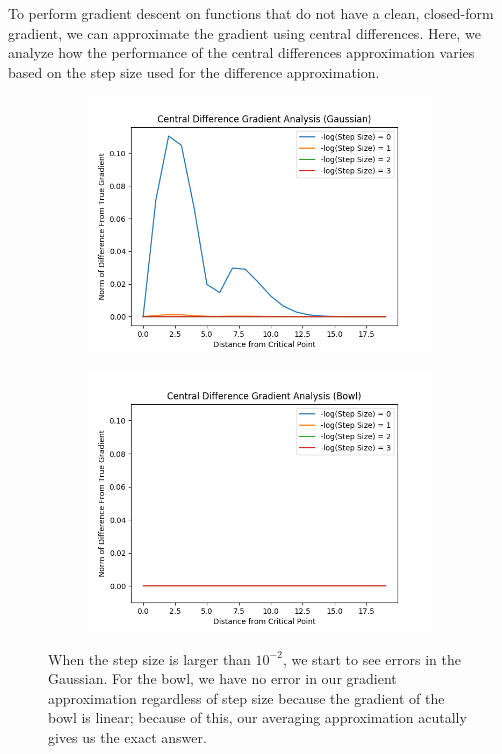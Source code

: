 \documentclass[8pt]{article}
\begin{document}
To perform gradient descent on functions that do not have a clean, closed-form gradient, we can approximate the gradient using central differences. Here, we analyze how the performance of the central differences approximation varies based on the step size used for the difference approximation.

\begin{figure}[H]
\centering
        \begin{subfigure}[b]{0.4\textwidth}
                \includegraphics[width=\linewidth]{../P1/figs/central_diff_gauss.png}
        \end{subfigure}%
        \begin{subfigure}[b]{0.4\textwidth}
                \includegraphics[width=\linewidth]{../P1/figs/central_diff_bowl.png}
        \end{subfigure}%
\caption*{When the step size is larger than $10^{-2}$, we start to see errors in the Gaussian. For the bowl, we have no error in our gradient approximation regardless of step size because the gradient of the bowl is linear; because of this, our averaging approximation acutally gives us the exact answer. }
\end{figure}
\end{document}
